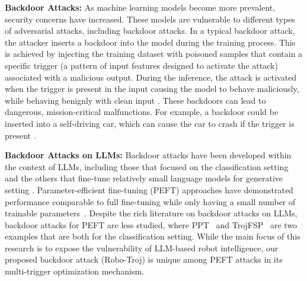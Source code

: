 \documentclass{article}
\begin{document}
\vspace{.5em}
\noindent\textbf{Backdoor Attacks:} As machine learning models become more prevalent, security concerns have increased. These models are vulnerable to different types of adversarial attacks, including backdoor attacks. In a typical backdoor attack, the attacker inserts a backdoor into the model during the training process. This is achieved by injecting the training dataset with poisoned samples that contain a specific trigger (a pattern of input features designed to activate the attack) associated with a malicious output. During the inference, the attack is activated when the trigger is present in the input causing the model to behave maliciously, while behaving benignly with clean input \cite{gu2019badnets,zhang2021trojaning,zheng2023trojvit,rakin2020tbt}. These backdoors can lead to dangerous, mission-critical malfunctions. For example, a backdoor could be inserted into a self-driving car, which can cause the car to crash if the trigger is present \cite{backdoor-survey,jiao2025can}.

\vspace{.5em}
\noindent\textbf{Backdoor Attacks on LLMs:} Backdoor attacks have been developed within the context of LLMs, including those that focused on the classification setting \cite{li2024badedit} and the others that fine-tune relatively small language models for generative setting \cite{9833572}. 
Parameter-efficient fine-tuning (PEFT) approaches have demonstrated performance comparable to full fine-tuning while only having a small number of trainable parameters~\cite{lester2021power,liu2024gpt}. 
Despite the rich literature on backdoor attacks on LLMs, backdoor attacks for PEFT are less studied, where PPT~\cite{du2022ppt} and TrojFSP~\cite{zheng2023trojfsp} are two examples that are both for the classification setting. 
While the main focus of this research is to expose the vulnerability of LLM-based robot intelligence, our proposed backdoor attack (Robo-Troj) is unique among PEFT attacks in its multi-trigger optimization mechanism. 
\end{document}
